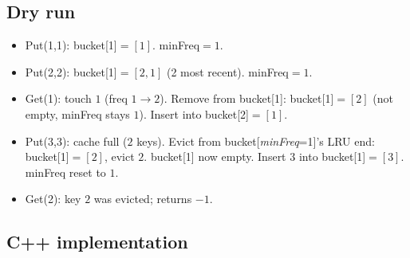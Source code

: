 \subsection*{Dry run}


\begin{itemize}
  \item Put(1,1): bucket[1]$=[1]$. minFreq$=1$.
  \item Put(2,2): bucket[1]$=[2,1]$ (2 most recent). minFreq$=1$.
  \item Get(1): touch $1$ (freq $1\to2$). Remove from bucket[1]:
        bucket[1]$=[2]$ (not empty, minFreq stays $1$). Insert into
        bucket[2]$=[1]$.
  \item Put(3,3): cache full ($2$ keys). Evict from bucket[\textit{minFreq}=1]'s
        LRU end: bucket[1]$=[2]$, evict $2$. bucket[1] now empty. Insert
        $3$ into bucket[1]$=[3]$. minFreq reset to $1$.
  \item Get(2): key $2$ was evicted; returns $-1$.
\end{itemize}

\subsection*{C++ implementation}

